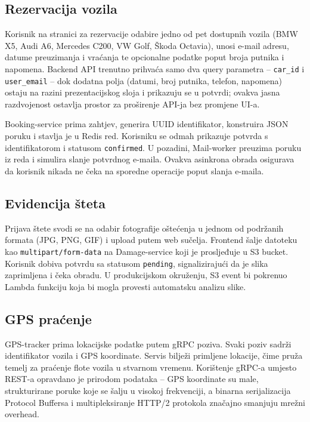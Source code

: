 \documentclass[12pt,a4paper]{article}
\begin{document}
\subsection{Rezervacija vozila}

Korisnik na stranici za rezervacije odabire jedno od pet dostupnih vozila (BMW X5, Audi A6, Mercedes C200, VW Golf, Škoda Octavia), unosi e-mail adresu, datume preuzimanja i vraćanja te opcionalne podatke poput broja putnika i napomena. Backend API trenutno prihvaća samo dva query parametra -- \texttt{car\_id} i \texttt{user\_email} -- dok dodatna polja (datumi, broj putnika, telefon, napomena) ostaju na razini prezentacijskog sloja i prikazuju se u potvrdi; ovakva jasna razdvojenost ostavlja prostor za proširenje API-ja bez promjene UI-a.

Booking-service prima zahtjev, generira UUID identifikator, konstruira JSON poruku i stavlja je u Redis red. Korisniku se odmah prikazuje potvrda s identifikatorom i statusom \texttt{confirmed}. U pozadini, Mail-worker preuzima poruku iz reda i simulira slanje potvrdnog e-maila. Ovakva asinkrona obrada osigurava da korisnik nikada ne čeka na sporedne operacije poput slanja e-maila.

\subsection{Evidencija šteta}

Prijava štete svodi se na odabir fotografije oštećenja u jednom od podržanih formata (JPG, PNG, GIF) i upload putem web sučelja. Frontend šalje datoteku kao \texttt{multipart/form-data} na Damage-service koji je prosljeđuje u S3 bucket. Korisnik dobiva potvrdu sa statusom \texttt{pending}, signalizirajući da je slika zaprimljena i čeka obradu. U produkcijskom okruženju, S3 event bi pokrenuo Lambda funkciju koja bi mogla provesti automatsku analizu slike.

\subsection{GPS praćenje}

GPS-tracker prima lokacijske podatke putem gRPC poziva. Svaki poziv sadrži identifikator vozila i GPS koordinate. Servis bilježi primljene lokacije, čime pruža temelj za praćenje flote vozila u stvarnom vremenu. Korištenje gRPC-a umjesto REST-a opravdano je prirodom podataka -- GPS koordinate su male, strukturirane poruke koje se šalju u visokoj frekvenciji, a binarna serijalizacija Protocol Buffersa i multipleksiranje HTTP/2 protokola značajno smanjuju mrežni overhead.
\end{document}
